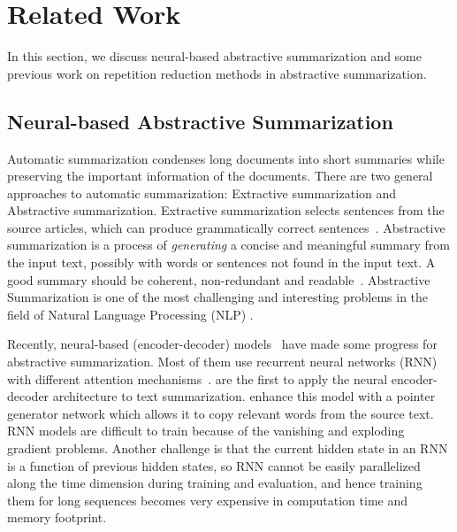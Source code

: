 \section{Related Work}
\label{sec:related}
In this section, we 
discuss neural-based abstractive summarization
and some previous work on repetition reduction methods in
abstractive summarization.

\subsection{Neural-based Abstractive Summarization}
Automatic summarization
condenses long documents into short summaries
while preserving the important information of the documents.
\citep{RadevHM02,AllahyariPASTGK17,Tian18}
There are two general approaches to automatic summarization: 
Extractive summarization and Abstractive summarization.
Extractive summarization selects sentences 
from the source articles, which can produce
grammatically correct sentences~\citep{BokaeiSL16,VermaL17,NaserasadiKS19,ZhongLWQH19}.
Abstractive summarization is a process of {\em generating} a concise and 
meaningful summary from the input text, possibly with words or sentences 
not found in the input text. 
A good summary should be coherent, 
non-redundant and readable~\citep{YaoWX17}.
Abstractive Summarization is one of the most challenging and 
interesting problems in the field of Natural Language Processing (NLP)
\citep{CareniniC08,PallottaDB09,SankarasubramaniamRG14,BingLLLGP15,RushCW15,LiHZ16,YaoWX17,NguyenCNN19}.

Recently, neural-based (encoder-decoder) models~
\citep{RushCW15,ChopraAR16,NallapatiZSGX16,SeeLM17,PaulusXS17,LiuL19,WangQW19,BART19,LiuJZ21}
have made some progress for abstractive summarization.
Most of them use recurrent neural networks (RNN) with different attention 
mechanisms~\citep{RushCW15,NallapatiZSGX16,SeeLM17,PaulusXS17}. \citet{RushCW15} are the first to apply the 
neural encoder-decoder architecture to text summarization. 
\citet{SeeLM17} enhance this model with a pointer generator network 
which allows it to copy relevant words from the source text.
RNN models are difficult to train because of the 
vanishing and exploding gradient problems.
Another challenge is that the current hidden state in an RNN is 
a function of previous hidden states, so RNN cannot be easily
parallelized along the time dimension during training and evaluation, 
and hence training them for long sequences becomes very expensive in 
computation time and memory footprint.

